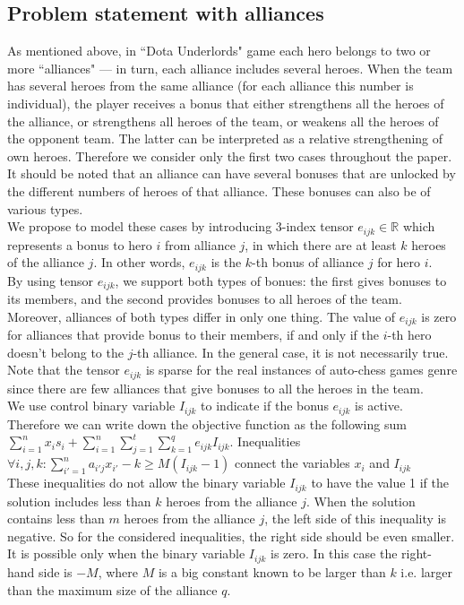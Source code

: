\documentclass[smallextended]{svjour3}       %
\begin{document}
\subsection{Problem statement with alliances}
As mentioned above, in ``Dota Underlords" game each hero belongs to two or more ``alliances" --- in turn, each alliance includes several heroes. When the team has several heroes from the same alliance (for each alliance this number is individual), the player receives a bonus that either strengthens all the heroes of the alliance, or strengthens all heroes of the team, or weakens all the heroes of the opponent team. The latter can be interpreted as a relative strengthening of own heroes. Therefore we consider only the first two cases throughout the paper. It should be noted that an alliance can have several bonuses that are unlocked by the different numbers of heroes of that alliance. These bonuses can also be of various types.\\
We propose to model these cases by introducing 3-index tensor $ e_{ijk} \in \mathbb{R} $ which represents a bonus to hero $i$ from alliance $j$, in which there are at least $k$ heroes of the alliance $j$. In other words, $ e_{ijk} $ is the $k$-th bonus of alliance $ j$ for hero $i$.\\
By using tensor $e_{ijk} $, we support both types of bonues: the first gives bonuses to its members, and the second provides bonuses to all heroes of the team. Moreover, alliances of both types differ in only one thing. The value of $e_{ijk} $ is zero for alliances that provide bonus to their members, if and only if the $i$-th hero doesn't belong to the $j$-th alliance. In the general case, it is not necessarily true. Note that the tensor $ e_{ijk} $ is sparse for the real instances of auto-chess games genre since there are few alliances that give bonuses to all the heroes in the team.
\\ We use control binary variable $ I_{ijk} $ to indicate if the bonus $ e_{ijk} $ is active.
Therefore we can write down the objective function as the following sum $ \sum_{i = 1}^{n} x_i s_i + \sum_{i=1}^{n} \sum_{j=1}^{t}  \sum_{k=1}^{q} e_{ijk} I_{ijk} $.
Inequalities $\forall{i,j,k} :  \sum_{i'=1}^{n} a_{i'j} x_{i'} -  k\ge M( I_{ijk} - 1)$ connect the variables $ x_{i} $ and $ I_{ijk} $
\\These inequalities do not allow the binary variable $ I_{ijk} $ to have the value 1 if the solution includes less than $k$ heroes from the alliance $j$. When the solution contains less than $m$ heroes from the alliance $j$, the left side of this inequality is negative. So for the considered inequalities, the right side should be even smaller. It is possible only when the binary variable $ I_{ijk} $ is zero. In this case the right-hand side is $-M $, where $M$ is a big constant known to be larger than $k$ i.e. larger than the maximum size of the alliance $q$.\\
\end{document}
